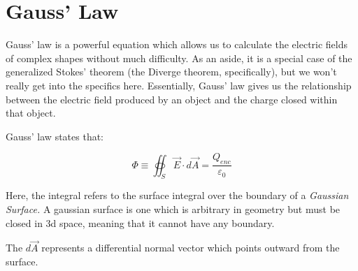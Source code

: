 \documentclass{report}
\theoremstyle{definition}
\numberwithin{equation}{section}
\numberwithin{definition}{section}
\begin{document}
    \section{Gauss' Law}

    Gauss' law is a powerful equation which allows us to calculate the electric fields of complex shapes without much difficulty. As an aside, it is a special case of the generalized Stokes' theorem (the Diverge theorem, specifically), but we won't really get into the specifics here. Essentially, Gauss' law gives us the relationship between the electric field produced by an object and the charge closed within that object. 
    
    \begin{theorem}
        Gauss' law states that:

        \[ \Phi \equiv \oiint_S \vec{E} \cdot d\vec{A} = \frac{Q_{enc}}{\varepsilon_0}\]

        Here, the integral refers to the surface integral over the boundary of a \textit{Gaussian Surface.} A gaussian surface is one which is arbitrary in geometry but must be closed in 3d space, meaning that it cannot have any boundary. 

        The $d\vec{A}$ represents a differential normal vector which points outward from the surface.
    \end{theorem}
\end{document}
